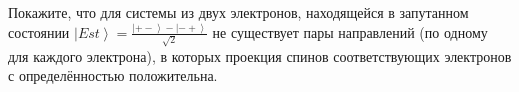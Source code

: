 \documentclass[__main__.tex]{subfiles}
\begin{document}
Покажите, что для системы из двух электронов, находящейся в запутанном состоянии $\left|Est\right>=\frac{\left|+-\right>-\left|-+\right>}{\sqrt{2}}$ не существует пары направлений (по одному для каждого электрона), в которых проекция спинов соответствующих электронов с определённостью положительна.\\ 

\end{document}
